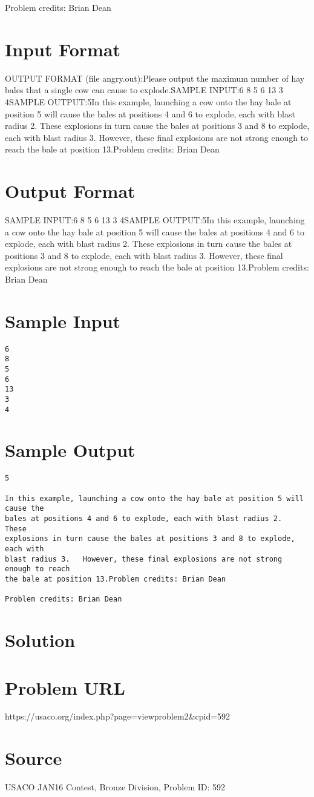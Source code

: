 \documentclass[12pt]{article}
\begin{document}
Problem credits: Brian Dean



\section*{Input Format}
OUTPUT FORMAT (file angry.out):Please output the maximum number of hay bales that a single cow can cause to
explode.SAMPLE INPUT:6
8
5
6
13
3
4SAMPLE OUTPUT:5In this example, launching a cow onto the hay bale at position 5 will cause the
bales at positions 4 and 6 to explode, each with blast radius 2.  These
explosions in turn cause the bales at positions 3 and 8 to explode, each with
blast radius 3.   However, these final explosions are not strong enough to reach
the bale at position 13.Problem credits: Brian Dean

\section*{Output Format}
SAMPLE INPUT:6
8
5
6
13
3
4SAMPLE OUTPUT:5In this example, launching a cow onto the hay bale at position 5 will cause the
bales at positions 4 and 6 to explode, each with blast radius 2.  These
explosions in turn cause the bales at positions 3 and 8 to explode, each with
blast radius 3.   However, these final explosions are not strong enough to reach
the bale at position 13.Problem credits: Brian Dean

\section*{Sample Input}
\begin{verbatim}
6
8
5
6
13
3
4
\end{verbatim}

\section*{Sample Output}
\begin{verbatim}
5

In this example, launching a cow onto the hay bale at position 5 will cause the
bales at positions 4 and 6 to explode, each with blast radius 2.  These
explosions in turn cause the bales at positions 3 and 8 to explode, each with
blast radius 3.   However, these final explosions are not strong enough to reach
the bale at position 13.Problem credits: Brian Dean

Problem credits: Brian Dean
\end{verbatim}

\section*{Solution}


\section*{Problem URL}
https://usaco.org/index.php?page=viewproblem2&cpid=592

\section*{Source}
USACO JAN16 Contest, Bronze Division, Problem ID: 592
\end{document}
